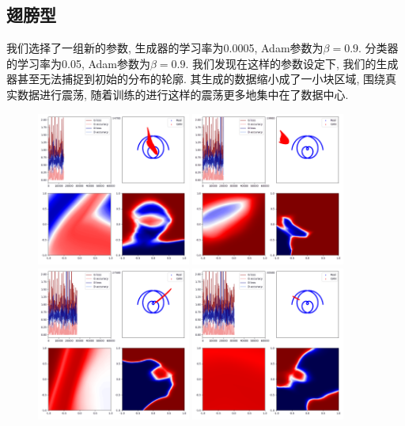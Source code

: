 \documentclass[lang=cn,11pt]{elegantpaper}
\begin{document}
\subsection{翅膀型}

我们选择了一组新的参数, 生成器的学习率为0.0005, Adam参数为$\beta=0.9$. 分类器的学习率为0.05, Adam参数为$\beta=0.9$. 我们发现在这样的参数设定下, 我们的生成器甚至无法捕捉到初始的分布的轮廓. 其生成的数据缩小成了一小块区域, 围绕真实数据进行震荡, 随着训练的进行这样的震荡更多地集中在了数据中心.

\begin{figure}[hbt]
\centering
  \includegraphics[width=0.45\textwidth]{wings_4_1}
  \includegraphics[width=0.45\textwidth]{wings_4_2}\\
  \includegraphics[width=0.45\textwidth]{wings_4_3}
  \includegraphics[width=0.45\textwidth]{wings_4_4}
  \caption{}
\end{figure}



\nocite{*}



\end{document}
